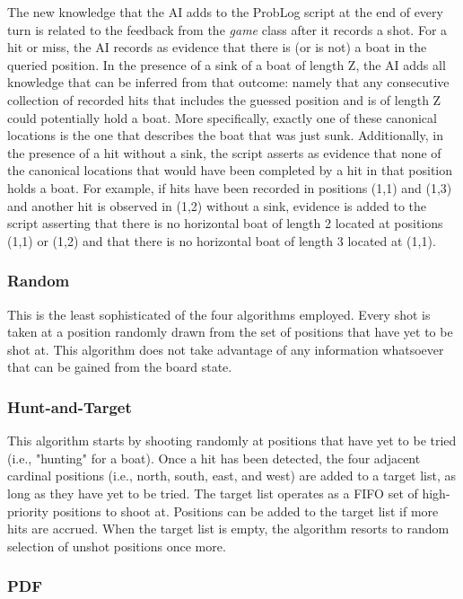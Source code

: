 \documentclass[]{article}
\begin{document}
The new knowledge that the AI adds to the ProbLog script at the end of every turn is related to the feedback from the \textit{game} class after it records a shot.  For a hit or miss, the AI records as evidence that there is (or is not) a boat in the queried position. In the presence of a sink of a boat of length Z, the AI adds all knowledge that can be inferred from that outcome: namely that any consecutive collection of recorded hits that includes the guessed position and is of length Z could potentially hold a boat. More specifically, exactly one of these canonical locations is the one that describes the boat that was just sunk. Additionally, in the presence of a hit without a sink, the script asserts as evidence that none of the canonical locations that would have been completed by a hit in that position holds a boat. For example, if hits have been recorded in positions (1,1) and (1,3) and another hit is observed in (1,2) without a sink, evidence is added to the script asserting that there is no horizontal boat of length 2 located at positions (1,1) or (1,2) and that there is no horizontal boat of length 3 located at (1,1).

\subsubsection{Random}

This is the least sophisticated of the four algorithms employed. Every shot is taken at a position randomly drawn from the set of positions that have yet to be shot at. This algorithm does not take advantage of any information whatsoever that can be gained from the board state.

\subsubsection{Hunt-and-Target}

This algorithm starts by shooting randomly at positions that have yet to be tried (i.e., "hunting" for a boat). Once a hit has been detected, the four adjacent cardinal positions (i.e., north, south, east, and west) are added to a target list, as long as they have yet to be tried. The target list operates as a FIFO set of high-priority positions to shoot at. Positions can be added to the target list if more hits are accrued. When the target list is empty, the algorithm resorts to random selection of unshot positions once more.

\subsubsection{PDF}
\end{document}
